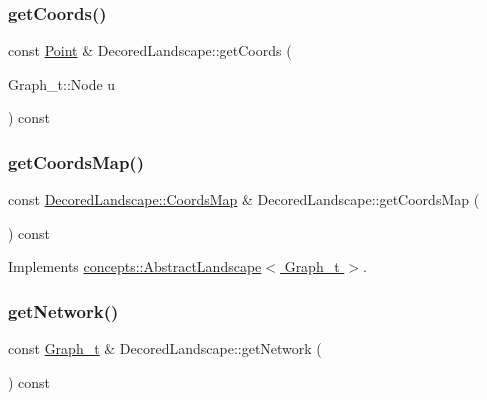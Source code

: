 \subsubsection{\texorpdfstring{get\+Coords()}{getCoords()}}
{\footnotesize\ttfamily const \hyperlink{abstract__landscape_8hpp_a9c14bcba65b035519a9c98f1eb1babbe}{Point} \& Decored\+Landscape\+::get\+Coords (\begin{DoxyParamCaption}\item[{Graph\+\_\+t\+::\+Node}]{u }\end{DoxyParamCaption}) const}

\mbox{\label{class_decored_landscape_a66994174c58cad04d5fa75cb24ef2772}} 
\subsubsection{\texorpdfstring{get\+Coords\+Map()}{getCoordsMap()}}
{\footnotesize\ttfamily const \hyperlink{classconcepts_1_1_abstract_landscape_a8432d7dff7edc5a5cbc524592b411f8a}{Decored\+Landscape\+::\+Coords\+Map} \& Decored\+Landscape\+::get\+Coords\+Map (\begin{DoxyParamCaption}{ }\end{DoxyParamCaption}) const\hspace{0.3cm}{\ttfamily [virtual]}}



Implements \hyperlink{classconcepts_1_1_abstract_landscape_a5005b0254f3c5aa0ed8505386fca92b3}{concepts\+::\+Abstract\+Landscape$<$ Graph\+\_\+t $>$}.

\mbox{\label{class_decored_landscape_ae0cf946d7f221b0b7cbf89a645806d74}} 
\subsubsection{\texorpdfstring{get\+Network()}{getNetwork()}}
{\footnotesize\ttfamily const \hyperlink{pl__reff_8cpp_a65aea14f39d53b24df9910d54216d620}{Graph\+\_\+t} \& Decored\+Landscape\+::get\+Network (\begin{DoxyParamCaption}{ }\end{DoxyParamCaption}) const\hspace{0.3cm}{\ttfamily [virtual]}}



